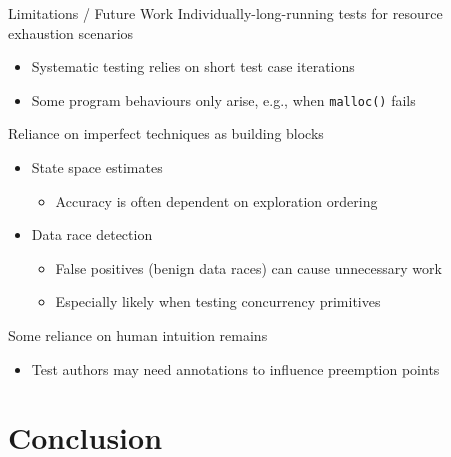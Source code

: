 \documentclass[xcolor=dvipsnames]{beamer}
\begin{document}
\begin{frame}{Limitations / Future Work}
	Individually-long-running tests for resource exhaustion scenarios
	\begin{itemize}
		\item Systematic testing relies on short test case iterations
		\item Some program behaviours only arise, e.g., when \texttt{malloc()} fails
	\end{itemize}
	\pause
	\linegap

	Reliance on imperfect techniques as building blocks
	\begin{itemize}
		\item State space estimates
			\begin{itemize}
				\item Accuracy is often dependent on exploration ordering
			\end{itemize}
		\item Data race detection
			\begin{itemize}
				\item False positives (benign data races) can cause unnecessary work
				\item Especially likely when testing concurrency primitives
			\end{itemize}
	\end{itemize}
	\pause
	\linegap

	Some reliance on human intuition remains
	\begin{itemize}
		\item Test authors may need annotations to influence preemption points
	\end{itemize}
\end{frame}

\section{Conclusion}

\end{document}
